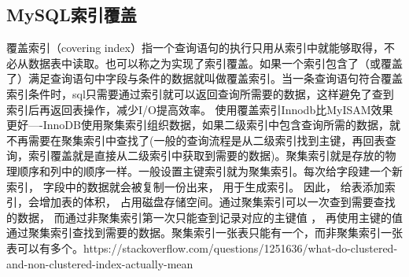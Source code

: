 \documentclass[../../../interview-questions.tex]{subfiles}
\begin{document}
\subsection{MySQL索引覆盖}

覆盖索引（covering index）指一个查询语句的执行只用从索引中就能够取得，不必从数据表中读取。也可以称之为实现了索引覆盖。如果一个索引包含了（或覆盖了）满足查询语句中字段与条件的数据就叫做覆盖索引。当一条查询语句符合覆盖索引条件时，sql只需要通过索引就可以返回查询所需要的数据，这样避免了查到索引后再返回表操作，减少I/O提高效率。
使用覆盖索引Innodb比MyISAM效果更好----InnoDB使用聚集索引组织数据，如果二级索引中包含查询所需的数据，就不再需要在聚集索引中查找了(一般的查询流程是从二级索引找到主键，再回表查询，索引覆盖就是直接从二级索引中获取到需要的数据)。聚集索引就是存放的物理顺序和列中的顺序一样。一般设置主键索引就为聚集索引。每次给字段建一个新索引， 字段中的数据就会被复制一份出来， 用于生成索引。 因此， 给表添加索引，会增加表的体积， 占用磁盘存储空间。通过聚集索引可以一次查到需要查找的数据， 而通过非聚集索引第一次只能查到记录对应的主键值 ， 再使用主键的值通过聚集索引查找到需要的数据。聚集索引一张表只能有一个，而非聚集索引一张表可以有多个。https://stackoverflow.com/questions/1251636/what-do-clustered-and-non-clustered-index-actually-mean
\end{document}
